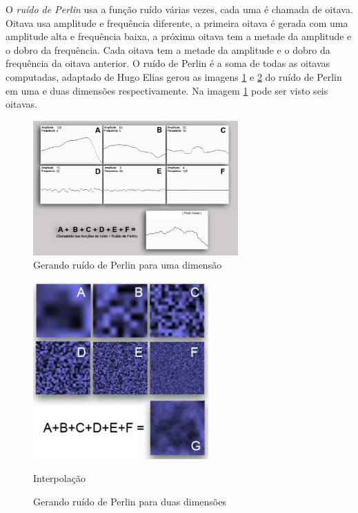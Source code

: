 O \textit{ruído de Perlin} usa a função ruído várias vezes, cada uma é chamada
de oitava. Oitava usa amplitude e frequência diferente, a primeira oitava é gerada com uma
amplitude alta e frequência baixa, a próxima oitava tem a metade da amplitude e 
o dobro da frequência. Cada oitava tem a metade da amplitude e o dobro da frequência da oitava anterior.
O ruído de Perlin é a soma de todas as oitavas computadas,
adaptado de Hugo Elias \cite{carli2012canion} gerou as imagens
\ref{fig:perlin1d} e \ref{fig:perlin2d} do ruído de Perlin em uma e duas
dimensões respectivamente. Na imagem \ref{fig:perlin1d} pode ser visto seis oitavas.
\begin{figure}[H]
    \centering
    \includegraphics[width=0.7\textwidth]{figuras/perlin1d.png}
    \caption{Gerando ruído de Perlin para uma dimensão}
    \label{fig:perlin1d}
\end{figure}
\begin{figure}[H]
    \centering
    \includegraphics[width=0.6\textwidth]{figuras/perlin2d.png}
    \caption{Gerando ruído de Perlin para duas dimensões}Interpolação
    \label{fig:perlin2d}
\end{figure}

